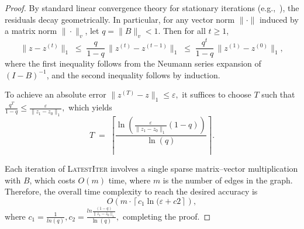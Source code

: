\documentclass[sigconf,review, nonacm]{acmart}
\newcommand\zz{\boldsymbol{\mathit{z}}}
\renewcommand\AA{\boldsymbol{\mathit{A}}}
\newcommand\BB{\boldsymbol{\mathit{B}}}
\newcommand\DD{\boldsymbol{\mathit{D}}}
\newcommand\II{\boldsymbol{\mathit{I}}}
\begin{document}
\begin{proof}
	
	By standard linear convergence theory for stationary iterations
	(e.g.,~\cite{varga2009matrix,saad2003iterative}),
	the residuals decay geometrically. In particular, for any vector norm
	$\|\cdot\|$ induced by a matrix norm $\|\cdot\|_v$, let
	$q = \|\BB\|_v < 1$. Then for all $t\ge 1$,
	\begin{equation}
		\label{eq:error_bound}
		\|\zz - \zz^{(t)}\|_1
		\;\le\;
		\frac{q}{1-q}\,
		\|\zz^{(t)} - \zz^{(t-1)}\|_1
		\;\le\;
		\frac{q^t}{1-q}\,
		\|\zz^{(1)} - \zz^{(0)}\|_1,
	\end{equation}
	where the first inequality follows from the Neumann series expansion of
	$(\II-\BB)^{-1}$, and the second inequality follows by induction.
	
	To achieve an absolute error
	$
	\| \zz^{(T)} - \zz\|_1
	\le \varepsilon,$
it suffices to choose $T$ such that
	$
	\frac{q^T}{1-q} \le \frac{\varepsilon}{\|\zz_1-\zz_0\|_1},$
	which yields
	\[
	T
	\;=\;
	\left\lceil
	\frac{\ln(\frac{\varepsilon}{\|\zz_1-\zz_0\|_1}(1-q))}{\ln(q)}
	\right\rceil.
	\]
	
	Each iteration of \textsc{LatestIter} involves a single sparse
	matrix--vector multiplication with $\BB$, which costs $O(m)$ time,
	where $m$ is the number of edges in the graph.
	Therefore, the overall time complexity to reach the desired accuracy is	\[
	O\!\left(
	m \cdot
	\left\lceil
	{c_1\ln({\varepsilon}+c2}
	\right\rceil
	\right),
	\]
	where $c_1=\frac{1}{ln(q)},c_2=\frac{ln{\frac{(1-q)}{\|\zz_1-\zz_0\|_1}}}{\ln(q)},$
	completing the proof.
\end{proof}



\end{document}
